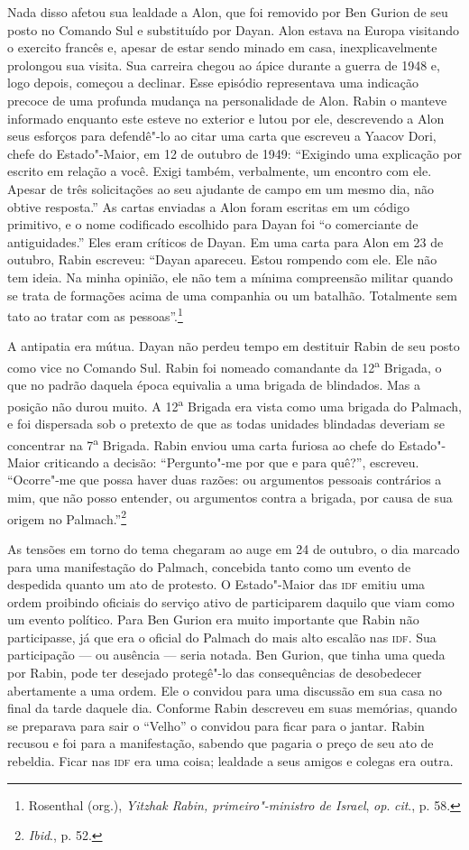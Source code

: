Nada disso afetou sua lealdade a Alon, que foi removido por Ben Gurion
de seu posto no Comando Sul e substituído por Dayan. Alon estava na
Europa visitando o exercito francês e, apesar de estar sendo minado em
casa, inexplicavelmente prolongou sua visita. Sua carreira chegou
ao ápice durante a guerra de 1948 e, logo depois, começou a declinar.
Esse episódio representava uma indicação precoce de uma profunda mudança
na personalidade de Alon. Rabin o manteve informado enquanto este
esteve no exterior e lutou por ele, descrevendo a Alon seus esforços
para defendê"-lo ao citar uma carta que escreveu a Yaacov Dori, chefe do
Estado"-Maior, em 12 de outubro de 1949: ``Exigindo uma explicação por
escrito em relação a você. Exigi também, verbalmente, um encontro com
ele. Apesar de três solicitações ao seu ajudante de campo em um mesmo
dia, não obtive resposta.'' As cartas enviadas a Alon foram escritas em
um código primitivo, e o nome codificado escolhido para Dayan foi ``o
comerciante de antiguidades.'' Eles eram críticos de Dayan. Em uma carta
para Alon em 23 de outubro, Rabin escreveu: ``Dayan apareceu. Estou
rompendo com ele. Ele não tem ideia. Na minha opinião, ele não tem a
mínima compreensão militar quando se trata de formações acima de uma
companhia ou um batalhão. Totalmente sem tato ao tratar com as
pessoas''.\footnote{Rosenthal (org.), \textit{Yitzhak Rabin, primeiro"-ministro de Israel}, \textit{op}. \textit{cit}., p. 58.}

A antipatia era mútua. Dayan não perdeu tempo em destituir Rabin de seu
posto como vice no Comando Sul. Rabin foi nomeado comandante da
12\textsuperscript{a} Brigada, o que no padrão daquela época equivalia a
uma brigada de blindados. Mas a posição não durou muito. A
12\textsuperscript{a} Brigada era vista como uma brigada do Palmach, e
foi dispersada sob o pretexto de que as todas unidades blindadas
deveriam se concentrar na 7\textsuperscript{a} Brigada. Rabin enviou
uma carta furiosa ao chefe do Estado"-Maior criticando a decisão: ``Pergunto"-me por que e para quê?'', escreveu. ``Ocorre"-me que possa
haver duas razões: ou argumentos pessoais contrários a mim, que não
posso entender, ou argumentos contra a brigada, por causa de sua origem
no Palmach.''\footnote{\textit{Ibid}., p. 52.}

As tensões em torno do tema chegaram ao auge em 24 de
outubro, o dia marcado para uma manifestação do Palmach, concebida tanto
como um evento de despedida quanto um ato de protesto. O Estado"-Maior
das \textsc{idf} emitiu uma ordem proibindo oficiais do serviço ativo de
participarem daquilo que viam como um evento político. Para Ben Gurion
era muito importante que Rabin não participasse, já que era o oficial do
Palmach do mais alto escalão nas \textsc{idf}. Sua participação --- ou ausência ---
seria notada. Ben Gurion, que tinha uma queda por Rabin, pode ter
desejado protegê"-lo das consequências de desobedecer abertamente a uma
ordem. Ele o convidou para uma discussão em sua casa no final da tarde
daquele dia. Conforme Rabin descreveu em suas memórias, quando se
preparava para sair o ``Velho'' o convidou para ficar para o jantar.
Rabin recusou e foi para a manifestação, sabendo que pagaria o preço de
seu ato de rebeldia. Ficar nas \textsc{idf} era uma coisa; lealdade a seus amigos
e colegas era outra.

